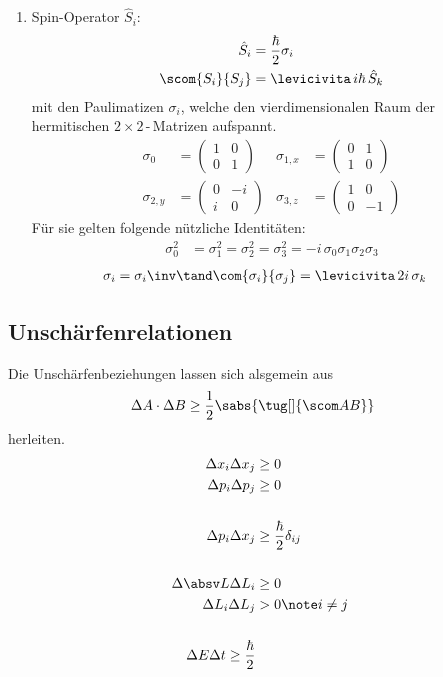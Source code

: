 \documentclass[twocolumn, unnumberedsubsub]{summery_5.0} %
\begin{document}
\begin{enumerate}
    \item Spin-Operator \(\hat S_i\):
    \begin{align*}
        \hat S_i &= \frac\hbar2 \sigma_i\\
        \scom{S_i}{S_j} &= \levicivita  \,i\hbar\,  \hat S_k
    \end{align*}
    mit den Paulimatizen \(\sigma_i\), welche den vierdimensionalen Raum der 
    hermitischen \(2\!\times\!2\)\(\,\)-\(\,\)Matrizen aufspannt.
    \begin{align*}
    \sigma_{0} &= \begin{pmatrix}1&0\\0&1\end{pmatrix}&
    \sigma_{1,x} &= \begin{pmatrix}0&1\\1&0\end{pmatrix}\\
    \sigma_{2,y} &= \begin{pmatrix}0&-i\\i&0\end{pmatrix}&
    \sigma_{3,z} &= \begin{pmatrix}1&0\\0&-1\end{pmatrix}
    \end{align*}
    Für sie gelten folgende nützliche Identitäten:
    \begin{align*}
        \sigma_0^2 &= \sigma_1^2  
        = \sigma_2^2 = \sigma_3^2 = -i\,\sigma_0\sigma_1\sigma_2\sigma_3
    \end{align*}
    \begin{align*}
        \sigma_i &= \sigma_i \inv \tand \com{\sigma_i}{\sigma_j} = \levicivita \,2i\, \sigma_k
    \end{align*}
\end{enumerate}


\subsection{Unschärfenrelationen}
Die Unschärfenbeziehungen lassen sich alsgemein aus 
\begin{align*}
    \Delta A \cdot \Delta B &\ge \frac12 \sabs{\tug[]{\scom AB}}
\end{align*}
herleiten.
\begin{align*}
    \Delta x_i \Delta x_j &\ge 0\\
    \Delta p_i \Delta p_j &\ge 0\\
    \\
    \Delta p_i \Delta x_j& \ge \frac \hbar 2 \delta_{ij}\\
    \\
    \Delta \absv L \Delta L_i &\ge 0\\
    \Delta L_i \Delta L_j &> 0\note i\neq j\\
    \\
    \Delta E \Delta t \ge \frac \hbar 2\\
\end{align*}
\end{document}
